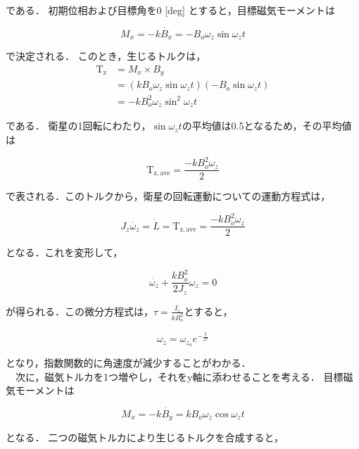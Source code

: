 である．
初期位相および目標角を0 [deg] とすると，目標磁気モーメントは

\begin{equation}
    M_x = -k\dot{B_x} = -B_o\omega_z\sin\omega_zt
\end{equation}

で決定される．
このとき，生じるトルクは，
\begin{equation}
    \begin{aligned}
        \mathrm{T_z} &= M_x \times B_y\\
                     &= (kB_o\omega_z\sin\omega_zt)(-B_o\sin\omega_zt)\\
                     &= -kB_o^2\omega_z\sin^2\omega_zt
    \end{aligned}
\end{equation}

である．
衛星の1回転にわたり，$\sin\omega_zt$の平均値は0.5となるため，その平均値は

\begin{equation}
    \mathrm{T_\mathrm{z,ave}} = \frac{-kB_o^2\omega_z}{2}
\end{equation}

で表される．このトルクから，衛星の回転運動についての運動方程式は，

\begin{equation}
    J_z\dot{\omega_z} = \dot{L} = \mathrm{T_\mathrm{z,ave}} = \frac{-kB_o^2\omega_z}{2}
\end{equation}

となる．これを変形して，

\begin{equation}
    \dot{\omega_z}+\frac{kB_o^2}{2J_z}\omega_z = 0
\end{equation}

が得られる．この微分方程式は，$\tau=\frac{I_z}{kB_o^2}$とすると，

\begin{equation}
    \omega_z = \omega_{z_o}e^{-\frac{t}{2\tau}} 
\end{equation}

となり，指数関数的に角速度が減少することがわかる．\\
　次に，磁気トルカを1つ増やし，それをy軸に添わせることを考える．
目標磁気モーメントは

\begin{equation}
    M_x = -k\dot{B_y} = kB_o\omega_z\cos\omega_zt
\end{equation}

となる．
二つの磁気トルカにより生じるトルクを合成すると，

